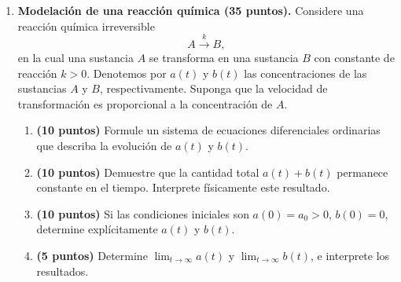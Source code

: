 \documentclass[a4paper,12pt]{article}
\begin{document}
\begin{enumerate}[leftmargin=*,itemsep=1cm]
\begin{enumerate}[label=\alph*),leftmargin=*,itemsep=0.3cm]
\item \textbf{(10 puntos)} Determine todos los puntos de equilibrio del sistema.
\item \textbf{(10 puntos)} Escriba el sistema en forma matricial $\dot{\mathbf X}=A\mathbf X$, $\mathbf X=\begin{pmatrix}x\\y\end{pmatrix}$. Determine la matriz $A$.
\item \textbf{(10 puntos)} Calcule los valores propios de la matriz $A$ y, a partir de ellos, clasifique el punto de equilibrio.
\item \textbf{(5 puntos)} Explique qué ocurre con las trayectorias que comienzan suficientemente cerca del equilibrio cuando $t\to\infty$.
\end{enumerate}
\item \textbf{Modelación de una reacción química (35 puntos).}
Considere una reacción química irreversible
\[A\xrightarrow{k}B,\]
en la cual una sustancia $A$ se transforma en una sustancia $B$ con constante de reacción $k>0$.
Denotemos por $a(t)$ y $b(t)$ las concentraciones de las sustancias $A$ y $B$, respectivamente.
Suponga que la velocidad de transformación es proporcional a la concentración de $A$.
\begin{enumerate}[label=\alph*),leftmargin=*,itemsep=0.3cm]
\item \textbf{(10 puntos)} Formule un sistema de ecuaciones diferenciales ordinarias que describa la evolución de $a(t)$ y $b(t)$.
\item \textbf{(10 puntos)} Demuestre que la cantidad total $a(t)+b(t)$ permanece constante en el tiempo. Interprete físicamente este resultado.
\item \textbf{(10 puntos)} Si las condiciones iniciales son $a(0)=a_0>0$, $b(0)=0$, determine explícitamente $a(t)$ y $b(t)$.
\item \textbf{(5 puntos)} Determine $\lim_{t\to\infty}a(t)$ y $\lim_{t\to\infty}b(t)$, e interprete los resultados.
\end{enumerate}
\end{enumerate}
\end{document}
